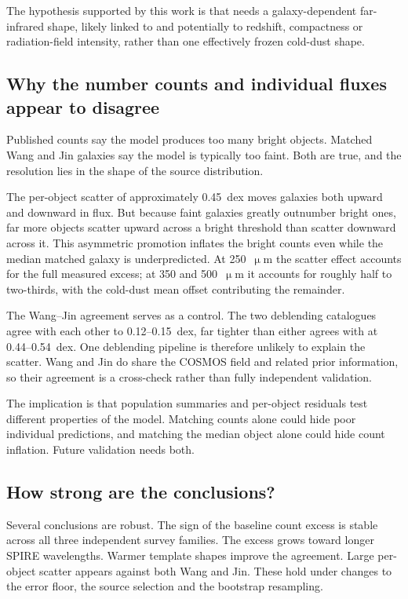 \documentclass[12pt,a4paper]{article}
\begin{document}
The hypothesis supported by this work is that \popcosmos{} needs a galaxy-dependent
far-infrared shape, likely linked to \LIR{} and potentially to redshift, compactness
or radiation-field intensity, rather than one effectively frozen cold-dust shape.

\subsection{Why the number counts and individual fluxes appear to disagree}
\label{sec:discussion:paradox}

Published counts say the model produces too many bright objects. Matched Wang and Jin
galaxies say the model is typically too faint. Both are true, and the resolution lies
in the shape of the source distribution.

The per-object scatter of approximately \SI{0.45}{dex} moves galaxies both upward and
downward in flux. But because faint galaxies greatly outnumber bright ones, far more
objects scatter upward across a bright threshold than scatter downward across it. This
asymmetric promotion inflates the bright counts even while the median matched galaxy is
underpredicted. At 250~$\upmu$m the scatter effect accounts for the full measured
excess; at 350 and 500~$\upmu$m it accounts for roughly half to two-thirds, with the
cold-dust mean offset contributing the remainder.

The Wang--Jin agreement serves as a control. The two deblending catalogues agree with
each other to 0.12--\SI{0.15}{dex}, far tighter than either agrees with \popcosmos{}
at 0.44--\SI{0.54}{dex}. One deblending pipeline is therefore unlikely to explain the
scatter. Wang and Jin do share the COSMOS field and related prior information, so their
agreement is a cross-check rather than fully independent validation.

The implication is that population summaries and per-object residuals test different
properties of the model. Matching counts alone could hide poor individual predictions,
and matching the median object alone could hide count inflation. Future validation needs
both.

\subsection{How strong are the conclusions?}
\label{sec:discussion:strength}

Several conclusions are robust. The sign of the baseline count excess is stable across
all three independent survey families. The excess grows toward longer SPIRE wavelengths.
Warmer template shapes improve the agreement. Large per-object scatter appears against
both Wang and Jin. These hold under changes to the error floor, the source selection and
the bootstrap resampling.
\end{document}
